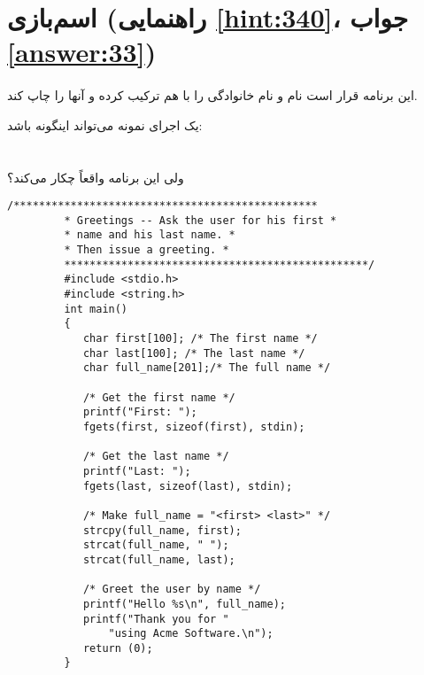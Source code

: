 \section[اسم‌بازی]{اسم‌بازی \protect{} (راهنمایی \ref{hint:340}، جواب \ref{answer:33})}
\paragraph{}\label{prog:63}
این برنامه قرار است نام و نام خانوادگی را با هم ترکیب کرده و آنها را چاپ کند.

یک اجرای نمونه می‌تواند اینگونه باشد:
\LTR\noindent
{}\\
\\
\\
\RTL
ولی این برنامه واقعاً چکار می‌کند؟

\begin{LTR}
    \begin{lstlisting}[style=C++Style]
         /************************************************
         * Greetings -- Ask the user for his first *
         * name and his last name. *
         * Then issue a greeting. *
         ************************************************/
         #include <stdio.h>
         #include <string.h>
         int main()
         {
         	char first[100]; /* The first name */
         	char last[100]; /* The last name */
         	char full_name[201];/* The full name */

         	/* Get the first name */
         	printf("First: ");
         	fgets(first, sizeof(first), stdin);

         	/* Get the last name */
         	printf("Last: ");
         	fgets(last, sizeof(last), stdin);

         	/* Make full_name = "<first> <last>" */
         	strcpy(full_name, first);
         	strcat(full_name, " ");
         	strcat(full_name, last);

         	/* Greet the user by name */
         	printf("Hello %s\n", full_name);
         	printf("Thank you for "
         		"using Acme Software.\n");
         	return (0);
         }
    \end{lstlisting}
\end{LTR}
